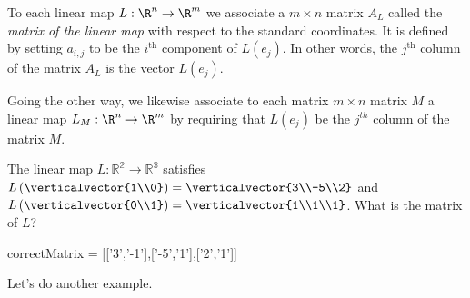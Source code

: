 \documentclass{ximera}
\begin{document}
\begin{definition}
  To each linear map $L: \R^n \to \R^m$ we associate a $m \times n$
  matrix $A_L$ called the \textit{matrix of the linear map} with
  respect to the standard coordinates.  It is defined by setting
  $a_{i,j}$ to be the $i^{\text{th}}$ component of $L(e_j)$.  In other words,
  the $j^{\text{th}}$ column of the matrix $A_L$ is the vector $L(e_j)$.

  Going the other way, we likewise associate to each matrix $m \times
  n$ matrix $M$ a linear map $L_M: \R^n \to \R^m$ by requiring that
  $L(e_j)$ be the $j^{th}$ column of the matrix $M$.
\end{definition}

\begin{question}
  The linear map $L:\mathbb{R^2}\to\mathbb{R^3}$ satisfies
  $L\left(\verticalvector{1\\0}\right) = \verticalvector{3\\-5\\2}$ and
  $L\left(\verticalvector{0\\1}\right) = \verticalvector{1\\1\\1}$.  What is the
  matrix of $L$?

  \begin{solution}
    \begin{matrix-answer}[name=L]
      correctMatrix = [['3','-1'],['-5','1'],['2','1']]
    \end{matrix-answer}    
  \end{solution}
\end{question}

Let's do another example.
\end{document}
